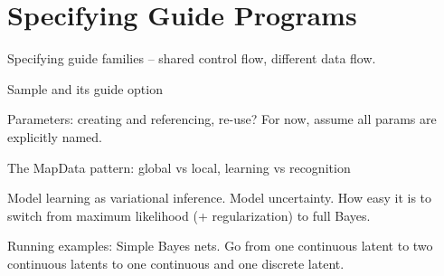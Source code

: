 \section{Specifying Guide Programs}
\label{sec:guideSpec}

Specifying guide families -- shared control flow, different data flow.

Sample and its guide option

Parameters: creating and referencing, re-use? For now, assume all params are explicitly named.

The MapData pattern: global vs local, learning vs recognition

Model learning as variational inference. Model uncertainty. How easy it is to switch from maximum likelihood (+ regularization) to full Bayes.

Running examples: Simple Bayes nets. Go from one continuous latent to two continuous latents to one continuous and one discrete latent.

